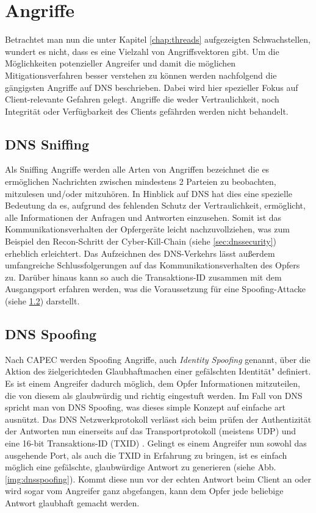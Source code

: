 \chapter{Angriffe}
\label{chap:attacks}

Betrachtet man nun die unter Kapitel \ref{chap:threads} aufgezeigten Schwachstellen, wundert es nicht, dass es eine Vielzahl von Angriffsvektoren gibt. Um die Möglichkeiten potenzieller Angreifer und damit die möglichen Mitigationsverfahren besser verstehen zu können werden nachfolgend die gängigsten Angriffe auf DNS beschrieben. Dabei wird hier spezieller Fokus auf Client-relevante Gefahren gelegt. Angriffe die weder Vertraulichkeit, noch Integrität oder Verfügbarkeit des Clients gefährden werden nicht behandelt.

\section{DNS Sniffing}
\label{sec:attacks-dnssniffing}

Als Sniffing Angriffe werden alle Arten von Angriffen bezeichnet die es ermöglichen Nachrichten zwischen mindestens 2 Parteien zu beobachten, mitzulesen und/oder mitzuhören\cite{CAPEC157}. In Hinblick auf DNS hat dies eine spezielle Bedeutung da es, aufgrund des fehlenden Schutz der Vertraulichkeit, ermöglicht, alle Informationen der Anfragen und Antworten einzusehen. Somit ist das Kommunikationsverhalten der Opfergeräte leicht nachzuvollziehen, was zum Beispiel den Recon-Schritt der Cyber-Kill-Chain (siehe \ref{sec:dnssecurity}) erheblich erleichtert. Das Aufzeichnen des DNS-Verkehrs lässt außerdem umfangreiche Schlussfolgerungen auf das Kommunikationsverhalten des Opfers zu. Darüber hinaus kann so auch die Transaktions-ID zusammen mit dem Ausgangsport erfahren werden, was die Voraussetzung für eine Spoofing-Attacke (siehe \ref{sec:attacks-dnsspoofing}) darstellt. 

\section{DNS Spoofing}
\label{sec:attacks-dnsspoofing}

Nach CAPEC werden Spoofing Angriffe, auch \textit{Identity Spoofing} genannt, über die Aktion des \"zielgerichteden Glaubhaftmachen einer gefälschten Identität" definiert. Es ist einem Angreifer dadurch möglich, dem Opfer Informationen mitzuteilen, die von diesem als glaubwürdig und richtig eingestuft werden. Im Fall von DNS spricht man von DNS Spoofing, was dieses simple Konzept auf einfache art ausnützt.
Das DNS Netzwerkprotokoll verlässt sich beim prüfen der Authentizität der Antworten nun einerseits auf das Transportprotokoll (meistens UDP) und eine 16-bit Transaktions-ID (TXID) \cite{rfc1035}. Gelingt es einem Angreifer nun sowohl das ausgehende Port, als auch die TXID in Erfahrung zu bringen, ist es einfach möglich eine gefälschte, glaubwürdige Antwort zu generieren (siehe Abb. \ref{img:dnsspoofing}). Kommt diese nun vor der echten Antwort beim Client an oder wird sogar vom Angreifer ganz abgefangen, kann dem Opfer jede beliebige Antwort glaubhaft gemacht werden.

